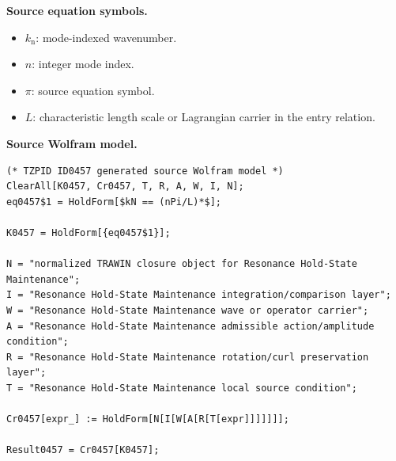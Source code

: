 \begin{minipage}[t]{0.49\linewidth}
\begingroup
\small
\raggedright
\textbf{Source equation symbols.}\par
\begin{itemize}[leftmargin=1.35em,itemsep=1pt,topsep=1pt,parsep=0pt]
    \item $k_{\mathrm{n}}$: mode-indexed wavenumber.
    \item $n$: integer mode index.
    \item $\pi$: source equation symbol.
    \item $L$: characteristic length scale or Lagrangian carrier in the entry relation.
\end{itemize}
\endgroup
\end{minipage}\hfill
\begin{minipage}[t]{0.47\linewidth}
\begingroup
\scriptsize
\raggedright
\textbf{Source Wolfram model.}\par
\begin{Verbatim}[fontsize=\tiny,breaklines=true,breakanywhere=true]
(* TZPID ID0457 generated source Wolfram model *)
ClearAll[K0457, Cr0457, T, R, A, W, I, N];
eq0457$1 = HoldForm[$kN == (nPi/L)*$];

K0457 = HoldForm[{eq0457$1}];

N = "normalized TRAWIN closure object for Resonance Hold-State Maintenance";
I = "Resonance Hold-State Maintenance integration/comparison layer";
W = "Resonance Hold-State Maintenance wave or operator carrier";
A = "Resonance Hold-State Maintenance admissible action/amplitude condition";
R = "Resonance Hold-State Maintenance rotation/curl preservation layer";
T = "Resonance Hold-State Maintenance local source condition";

Cr0457[expr_] := HoldForm[N[I[W[A[R[T[expr]]]]]]];

Result0457 = Cr0457[K0457];
\end{Verbatim}
\endgroup
\end{minipage}

